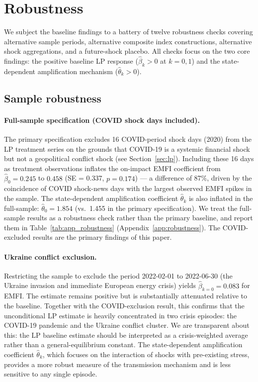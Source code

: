 \documentclass[11pt]{article}
\begin{document}
\section{Robustness}

\label{sec:robustness}

We subject the baseline findings to a battery of twelve robustness checks covering
alternative sample periods, alternative composite index constructions, alternative shock
aggregations, and a future-shock placebo. All checks focus on the two core findings:
the positive baseline LP response ($\hat\beta_k > 0$ at $k=0,1$) and the state-dependent
amplification mechanism ($\hat\theta_k > 0$).

\subsection{Sample robustness}
\label{sec:rob_sample}

\paragraph{Full-sample specification (COVID shock days included).}
The primary specification excludes 16 COVID-period shock days (2020) from the LP
treatment series on the grounds that COVID-19 is a systemic financial shock but
not a geopolitical conflict shock (see Section~\ref{sec:lp}).
Including these 16 days as treatment observations inflates the on-impact EMFI
coefficient from $\hat\beta_0 = 0.245$ to $0.458$ (SE = 0.337, $p = 0.174$) ---
a difference of 87\%, driven by the coincidence of COVID shock-news days with the
largest observed EMFI spikes in the sample.
The state-dependent amplification coefficient $\hat\theta_k$ is also inflated in
the full-sample: $\hat\theta_0 = 1.854$ (vs.\ 1.455 in the primary specification).
We treat the full-sample results as a robustness check rather than the primary
baseline, and report them in Table~\ref{tab:app_robustness} (Appendix~\ref{app:robustness}).
The COVID-excluded results are the primary findings of this paper.

\paragraph{Ukraine conflict exclusion.}
Restricting the sample to exclude the period 2022-02-01 to 2022-06-30 (the Ukraine
invasion and immediate European energy crisis) yields $\hat\beta_{k=0} = 0.083$ for
EMFI. The estimate remains positive but is substantially attenuated relative to the
baseline. Together with the COVID-exclusion result, this confirms that the unconditional
LP estimate is heavily concentrated in two crisis episodes: the COVID-19 pandemic and
the Ukraine conflict cluster. We are transparent about this: the LP baseline estimate
should be interpreted as a crisis-weighted average rather than a general-equilibrium
constant. The state-dependent amplification coefficient $\hat\theta_k$, which focuses
on the interaction of shocks with pre-existing stress, provides a more robust measure
of the transmission mechanism and is less sensitive to any single episode.
\end{document}
